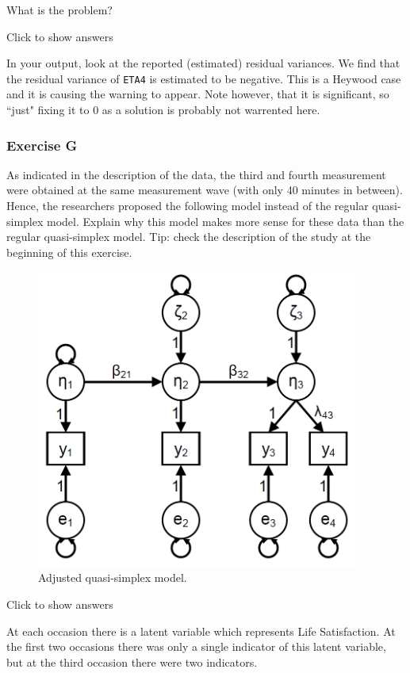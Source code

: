 \documentclass[
]{book}
\begin{document}
What is the problem?

Click to show answers

In your output, look at the reported (estimated) residual variances. We find that the residual variance of \texttt{ETA4} is estimated to be negative. This is a Heywood case and it is causing the warning to appear. Note however, that it is significant, so ``just" fixing it to 0 as a solution is probably not warrented here.

\hypertarget{exercise-g}{%
\subsubsection*{Exercise G}\label{exercise-g}}

As indicated in the description of the data, the third and fourth measurement were obtained at the same measurement wave (with only 40 minutes in between). Hence, the researchers proposed the following model instead of the regular quasi-simplex model. Explain why this model makes more sense for these data than the regular quasi-simplex model. Tip: check the description of the study at the beginning of this exercise.

\begin{figure}
\centering
\includegraphics[width=4.16667in,height=\textheight]{Simplex-adjusted.png}
\caption{Adjusted quasi-simplex model.}
\end{figure}

Click to show answers

At each occasion there is a latent variable which represents Life Satisfaction. At the first two occasions there was only a single indicator of this latent variable, but at the third occasion there were two indicators.
\end{document}
